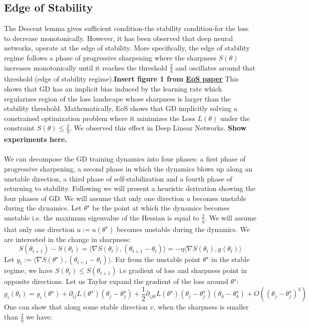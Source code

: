 \documentclass[11pt]{article}
\begin{document}
\subsection*{Edge of Stability}
The Descent lemma gives sufficient condition-the stability condition-for the loss to decrease monotonically. However, it has been observed that deep neural networks, operate at the edge of stability. More specifically, the edge of stability regime follows a phase of progressive sharpening where the sharpness $S(\theta)$ increases monotonically until it reaches the threshold $\frac{2}{\eta}$ and oscillates around that threshold (edge of stability regime).\textbf{Insert figure 1 from \href{https://par.nsf.gov/servlets/purl/10416371}{EoS paper}} This shows that GD has an implicit bias induced by the learning rate which regularizes region of the loss landscape whose sharpness is larger than the stability threshold. Mathematically, EoS shows that GD implicitly solving a constrained optimization problem where it minimizes the Loss $L(\theta)$ under the constraint $S(\theta) \leq \frac{2}{\eta}$. We observed this effect in Deep Linear Networks. \textbf{Show experiments here.} 
\\
\\
We can decompose the GD training dynamics into four phases: a first phase of progressive sharpening, a second phase in which the dynamics blows up along an unstable direction, a third phase of self-stabilization and a fourth phase of returning to stability. Following \cite{damian2022self} we will present a heuristic derivation showing the four phases of GD. We will assume that only one direction $u$ becomes unstable during the dynamics. Let $\theta^{\star}$ be the point at which the dynamics becomes unstable i.e. the maximum eigenvalue of the Hessian is equal to $\frac{2}{\eta}$. We will assume that only one direction $u:=u(\theta^{\star})$ becomes unstable during the dynamics. We are interested in the change in sharpness:
\begin{equation}
      S(\theta_{t+1}) - S(\theta_t) = \langle\nabla S(\theta_t),(\theta_{t+1} - \theta_t)\rangle = - \eta \langle\nabla S(\theta_t),g(\theta_t)\rangle
\end{equation}
Let $y_t := \langle\nabla S(\theta^{\star}),(\theta_{t+1} - \theta_t)\rangle$. Far from the unstable point $\theta^{\star}$ in the stable regime, we have $S(\theta_{t}) \leq S(\theta_{t+1})$ i.e gradient of loss and sharpness point in opposite directions. Let us Taylor expand the gradient of the loss around $\theta^{\star}$:
\begin{equation}
      g_i(\theta_{t}) = g_i(\theta^{\star}) + \partial_{ij} L(\theta^{\star})(\theta_j - \theta_j^{\star}) + \frac{1}{2} \partial_{ijk} L(\theta^{\star})(\theta_j - \theta_j^{\star})(\theta_k - \theta_k^{\star}) + O((\theta_j - \theta_j^{\star})^3)
\end{equation}
One can show that along some stable direction $v$, when the sharpness is smaller than $\frac{2}{\eta}$ we have:
\end{document}

